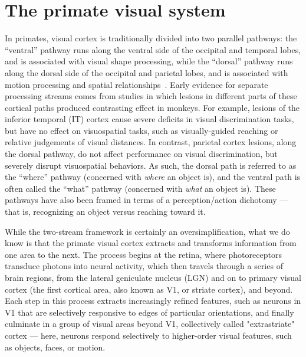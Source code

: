 \section{The primate visual system}
In primates, visual cortex is traditionally divided into two parallel pathways: the ``ventral'' pathway runs along the ventral side of the occipital and temporal lobes, and is associated with visual shape processing, while the  ``dorsal'' pathway runs along the dorsal side of the occipital and parietal lobes, and is associated with motion processing and spatial relationships~\cite{Mishkin1982CONTRIBUTIONMONKEYS, Ungerleider1994WhatBrain, Felleman1991}. Early evidence for separate processing streams comes from studies in which lesions in different parts of these cortical paths produced contrasting effect in monkeys. For example, lesions of the inferior temporal (IT) cortex cause severe deficits in visual discrimination tasks, but have no effect on visuospatial tasks, such as visually-guided reaching or relative judgements of visual distances. In contrast, parietal cortex lesions, along the dorsal pathway, do not affect performance on visual discrimination, but severely disrupt visuospatial behaviors. As such, the dorsal path is referred to as the ``where'' pathway (concerned with \textit{where} an object is), and the ventral path is often called the ``what'' pathway (concerned with \textit{what} an object is)\cite{Ungerleider1994WhatBrain}. These pathways have also been framed in terms of a perception/action dichotomy --- that is, recognizing an object versus reaching toward it\cite{Goodale1992}.

While the two-stream framework is certainly an oversimplification, what we do know is that the primate visual cortex extracts and transforms information from one area to the next. The process begins at the retina, where photoreceptors transduce photons into neural activity, which then travels through a series of brain regions, from the lateral geniculate nucleus (LGN) and on to primary visual cortex (the first cortical area, also known as V1, or striate cortex), and beyond. Each step in this process extracts increasingly refined features, such as neurons in V1 that are selectively responsive to edges of particular orientations, and finally culminate in a group of visual areas beyond V1, collectively called "extrastriate" cortex --- here, neurons respond selectively to higher-order visual features, such as objects, faces, or motion\cite{Orban2008, DiCarlo2012}. 

